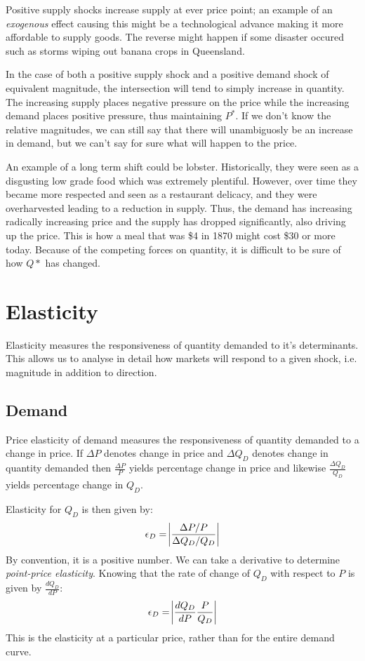 \documentclass[12pt]{report}
\begin{document}
\bigskip
Positive supply shocks increase supply at ever price point; an example of an \textit{exogenous} effect
causing this might be a technological advance making it more affordable to supply goods. The 
reverse might happen if some disaster occured such as storms wiping out banana crops in Queensland.

\bigskip
In the case of both a positive supply shock and a positive demand shock of equivalent magnitude,
the intersection will tend to simply increase in quantity. The increasing supply places negative pressure on the price while the increasing
demand places positive pressure, thus maintaining \(P^*\). If we don't know the relative magnitudes,
we can still say that there will unambiguosly be an increase in demand, but we can't say for sure
what will happen to the price.

\bigskip
An example of a long term shift could be lobster. Historically, they were seen as a disgusting low
grade food which was extremely plentiful. However, over time they became more respected and seen
 as a restaurant delicacy, and they were overharvested leading to a reduction in supply.
 Thus, the demand has increasing radically increasing price and the supply has dropped significantly,
 also driving up the price. This is how a meal that was \$4 in 1870 might cost \$30 or more today.
Because of the competing forces on quantity, it is difficult to be sure of how \(Q*\) has changed.

\section*{Elasticity}

Elasticity measures the responsiveness of quantity demanded to it's determinants. This allows us
to analyse in detail how markets will respond to a given shock, i.e. magnitude in addition to direction.

\subsection*{Demand}

Price elasticity of demand measures the responsiveness of quantity demanded to a change in price. If
\(\Delta P\) denotes change in price and \(\Delta Q_D\) denotes change in quantity demanded then 
\(\frac{\Delta P}{P}\) yields percentage change in price and likewise \(\frac{\Delta Q_D}{Q_D}\) yields
percentage change in \(Q_D\).

\bigskip
Elasticity for \(Q_D\) is then given by:
\[\epsilon_D = \abs{\frac{\Delta P / P}{\Delta Q_D / Q_D}}\]
By convention, it is a positive number. We can take a derivative to determine
\textit{point-price elasticity}. Knowing that the rate of change of \(Q_D\) with
respect to \(P\) is given by \(\frac{dQ_D}{dP}\):
\[\epsilon_D = \abs{\frac{dQ_D}{dP}\frac{P}{Q_D}}\]
This is the elasticity at a particular price, rather than for the entire demand curve.
\end{document}
